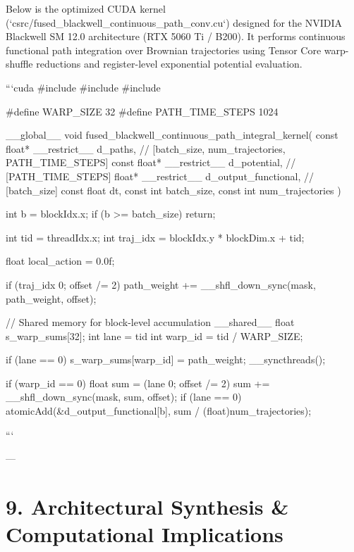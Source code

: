 \documentclass[11pt,twoside,openright]{amsbook}
\begin{document}
Below is the optimized CUDA kernel (`csrc/fused_blackwell_continuous_path_conv.cu`) designed for the NVIDIA Blackwell SM 12.0 architecture (RTX 5060 Ti / B200). It performs continuous functional path integration over Brownian trajectories using Tensor Core warp-shuffle reductions and register-level exponential potential evaluation.

```cuda
#include 
#include 
#include 

#define WARP_SIZE 32
#define PATH_TIME_STEPS 1024

__global__ void fused_blackwell_continuous_path_integral_kernel(
    const float* __restrict__ d_paths,        // [batch_size, num_trajectories, PATH_TIME_STEPS]
    const float* __restrict__ d_potential,    // [PATH_TIME_STEPS]
    float* __restrict__ d_output_functional,  // [batch_size]
    const float dt,
    const int batch_size,
    const int num_trajectories
) {
    int b = blockIdx.x;
    if (b >= batch_size) return;

    int tid = threadIdx.x;
    int traj_idx = blockIdx.y * blockDim.x + tid;

    float local_action = 0.0f;

    if (traj_idx  0; offset /= 2) {
        path_weight += __shfl_down_sync(mask, path_weight, offset);
    }

    // Shared memory for block-level accumulation
    __shared__ float s_warp_sums[32];
    int lane = tid %
    int warp_id = tid / WARP_SIZE;

    if (lane == 0) {
        s_warp_sums[warp_id] = path_weight;
    }
    __syncthreads();

    if (warp_id == 0) {
        float sum = (lane  0; offset /= 2) {
            sum += __shfl_down_sync(mask, sum, offset);
        }
        if (lane == 0) {
            atomicAdd(&d_output_functional[b], sum / (float)num_trajectories);
        }
    }
}
```

---

\section{9. Architectural Synthesis & Computational Implications}
\end{document}
